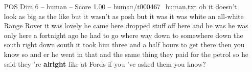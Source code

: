 \begin{textsample}{POS Dim 6 – human – Score 1.00 – human/t000467\_human.txt}  \label{ex:f6_pos_007}
oh it doesn't look as big as the like but it wasn't as posh but it was it was white an all-white Range Rover it was lovely he came here dropped stuff off here and he was he was only here a fortnight ago he had to go where way down to somewhere down the south right down south it took him three and a half hours to get there then you know so and er he went in that and the same thing they paid for the petrol so he said they 're \textbf{alright} like at Fords if you 've asked them you know?

\end{textsample}
